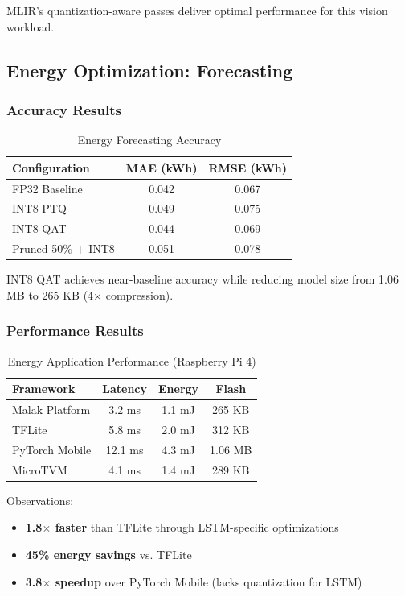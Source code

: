 MLIR's quantization-aware passes deliver optimal performance for this vision workload.

\subsection{Energy Optimization: Forecasting}

\subsubsection{Accuracy Results}

\begin{table}[h]
\centering
\caption{Energy Forecasting Accuracy}
\label{tab:energy_accuracy}
\begin{tabular}{lcc}
\hline
\textbf{Configuration} & \textbf{MAE (kWh)} & \textbf{RMSE (kWh)} \\
\hline
FP32 Baseline & 0.042 & 0.067 \\
INT8 PTQ & 0.049 & 0.075 \\
INT8 QAT & 0.044 & 0.069 \\
Pruned 50\% + INT8 & 0.051 & 0.078 \\
\hline
\end{tabular}
\end{table}

INT8 QAT achieves near-baseline accuracy while reducing model size from 1.06 MB to 265 KB (4$\times$ compression).

\subsubsection{Performance Results}

\begin{table}[h]
\centering
\caption{Energy Application Performance (Raspberry Pi 4)}
\label{tab:energy_perf}
\begin{tabular}{lccc}
\hline
\textbf{Framework} & \textbf{Latency} & \textbf{Energy} & \textbf{Flash} \\
\hline
Malak Platform & 3.2 ms & 1.1 mJ & 265 KB \\
TFLite & 5.8 ms & 2.0 mJ & 312 KB \\
PyTorch Mobile & 12.1 ms & 4.3 mJ & 1.06 MB \\
MicroTVM & 4.1 ms & 1.4 mJ & 289 KB \\
\hline
\end{tabular}
\end{table}

Observations:
\begin{itemize}
\item \textbf{1.8$\times$ faster} than TFLite through LSTM-specific optimizations
\item \textbf{45\% energy savings} vs. TFLite
\item \textbf{3.8$\times$ speedup} over PyTorch Mobile (lacks quantization for LSTM)
\end{itemize}

